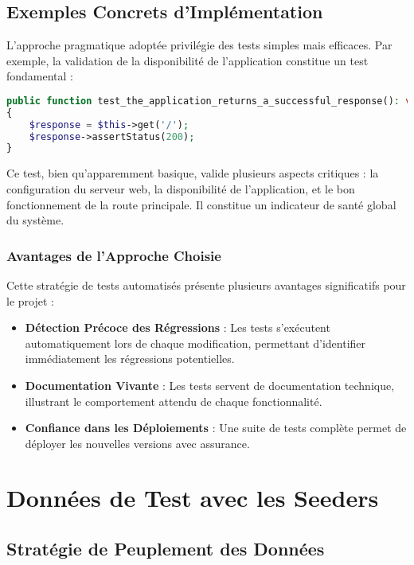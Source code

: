 \documentclass[12pt,a4paper]{report}
\begin{document}
\subsection{Exemples Concrets d'Implémentation}

L'approche pragmatique adoptée privilégie des tests simples mais efficaces. Par exemple, la validation de la disponibilité de l'application constitue un test fondamental :

\begin{lstlisting}[language=PHP]
public function test_the_application_returns_a_successful_response(): void
{
    $response = $this->get('/');
    $response->assertStatus(200);
}
\end{lstlisting}

Ce test, bien qu'apparemment basique, valide plusieurs aspects critiques : la configuration du serveur web, la disponibilité de l'application, et le bon fonctionnement de la route principale. Il constitue un indicateur de santé global du système.

\subsubsection{Avantages de l'Approche Choisie}

Cette stratégie de tests automatisés présente plusieurs avantages significatifs pour le projet :

\begin{itemize}
\item \textbf{Détection Précoce des Régressions} : Les tests s'exécutent automatiquement lors de chaque modification, permettant d'identifier immédiatement les régressions potentielles.
\item \textbf{Documentation Vivante} : Les tests servent de documentation technique, illustrant le comportement attendu de chaque fonctionnalité.
\item \textbf{Confiance dans les Déploiements} : Une suite de tests complète permet de déployer les nouvelles versions avec assurance.
\end{itemize}

\section{Données de Test avec les Seeders}

\subsection{Stratégie de Peuplement des Données}
\end{document}
